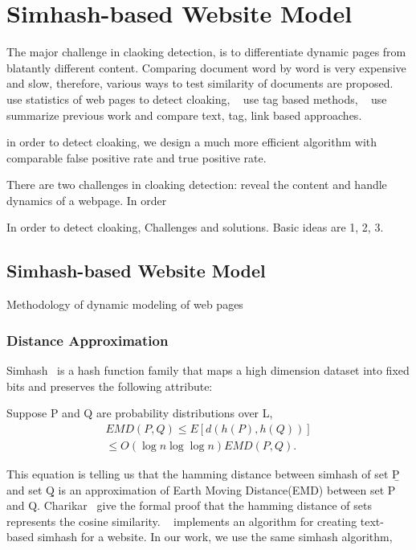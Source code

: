 \section{Simhash-based Website Model}
\label{s:methodology}
The major challenge in claoking detection, is to differentiate dynamic pages
from blatantly different content.
Comparing document word by word is very expensive and slow, therefore, 
various ways to test similarity of documents are proposed. 
 ~\cite{wu2006detecting} use statistics of web pages to detect cloaking,
 ~\cite{lin2009detection} use tag based methods,
 ~\cite{deng2013uncovering} use summarize previous work and compare text, tag,
 link based approaches.

in order to detect cloaking, we design a much more efficient algorithm with
comparable false positive rate and true positive rate.

There are two challenges in cloaking detection: reveal the content and handle
dynamics of a webpage.
In order 

In order to detect cloaking,
Challenges and solutions. Basic ideas are 1, 2, 3.




\subsection{Simhash-based Website Model}
Methodology of dynamic modeling of web pages
\subsubsection{Distance Approximation}
Simhash~\cite{charikar2002similarity} is a hash function family that maps a high dimension dataset into fixed
bits and preserves the following attribute:

Suppose P and Q are probability distributions over L, 
\begin{multline}
  EMD(P, Q) \le E[d(h(P), h(Q))] \\
  \le O(\log{n}\log{\log{n}})EMD(P, Q).
\end{multline}

This equation is telling us that the hamming distance between simhash of set
\b{P} and set \b{Q} is an approximation of Earth Moving Distance(EMD) between set P
and Q. Charikar~\cite{charikar2002similarity} give the formal proof that the
hamming distance of sets represents the cosine similarity.
~\cite{manku2007detecting} implements an algorithm for creating text-based
simhash for a website. In our work, we use the same simhash algorithm,


